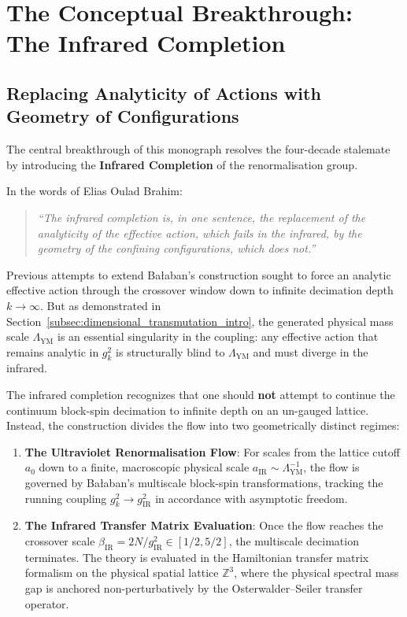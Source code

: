 \section{The Conceptual Breakthrough: The Infrared Completion}
\label{sec:infrared_completion_overview}

\subsection{Replacing Analyticity of Actions with Geometry of Configurations}
\label{subsec:replacing_analyticity}
The central breakthrough of this monograph resolves the four-decade stalemate by introducing the \textbf{Infrared Completion} of the renormalisation group. 

In the words of Elias Oulad Brahim:
\begin{quote}
\emph{``The infrared completion is, in one sentence, the replacement of the analyticity of the effective action, which fails in the infrared, by the geometry of the confining configurations, which does not.''}
\end{quote}
Previous attempts to extend Ba\l aban's construction sought to force an analytic effective action through the crossover window down to infinite decimation depth $k \to \infty$. But as demonstrated in Section~\ref{subsec:dimensional_transmutation_intro}, the generated physical mass scale $\Lambda_{\mathrm{YM}}$ is an essential singularity in the coupling: any effective action that remains analytic in $g_k^2$ is structurally blind to $\Lambda_{\mathrm{YM}}$ and must diverge in the infrared.

The infrared completion recognizes that one should \textbf{not} attempt to continue the continuum block-spin decimation to infinite depth on an un-gauged lattice. Instead, the construction divides the flow into two geometrically distinct regimes:
\begin{enumerate}
    \item \textbf{The Ultraviolet Renormalisation Flow}: For scales from the lattice cutoff $a_0$ down to a finite, macroscopic physical scale $a_{\mathrm{IR}} \sim \Lambda_{\mathrm{YM}}^{-1}$, the flow is governed by Ba\l aban's multiscale block-spin transformations, tracking the running coupling $g_k^2 \to g_{\mathrm{IR}}^2$ in accordance with asymptotic freedom.
    \item \textbf{The Infrared Transfer Matrix Evaluation}: Once the flow reaches the crossover scale $\beta_{\mathrm{IR}} = 2N/g_{\mathrm{IR}}^2 \in [1/2, 5/2]$, the multiscale decimation terminates. The theory is evaluated in the Hamiltonian transfer matrix formalism on the physical spatial lattice $\mathbb{Z}^3$, where the physical spectral mass gap is anchored non-perturbatively by the Osterwalder--Seiler transfer operator.
\end{enumerate}

